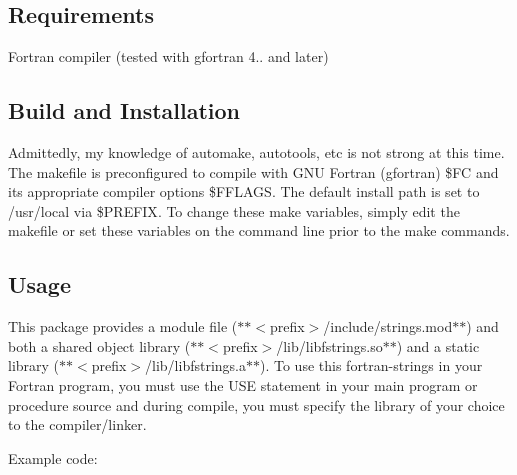\subsection*{Requirements}


\begin{DoxyItemize}
\item Fortran compiler (tested with gfortran 4.. and later)
\end{DoxyItemize}

\subsection*{Build and Installation}

Admittedly, my knowledge of automake, autotools, etc is not strong at this time. The makefile is preconfigured to compile with G\+NU Fortran (gfortran) {\ttfamily \$\+FC} and its appropriate compiler options {\ttfamily \$\+F\+F\+L\+A\+GS}. The default install path is set to {\ttfamily /usr/local} via {\ttfamily \$\+P\+R\+E\+F\+IX}. To change these make variables, simply edit the makefile or set these variables on the command line prior to the make commands.


\begin{DoxyCode}{0}
\end{DoxyCode}


\subsection*{Usage}

This package provides a module file ($\ast$$\ast${\ttfamily $<$prefix$>$/include/strings.mod}$\ast$$\ast$) and both a shared object library ($\ast$$\ast${\ttfamily $<$prefix$>$/lib/libfstrings.so}$\ast$$\ast$) and a static library ($\ast$$\ast${\ttfamily $<$prefix$>$/lib/libfstrings.a}$\ast$$\ast$). To use this {\ttfamily fortran-\/strings} in your Fortran program, you must use the {\ttfamily U\+SE} statement in your main program or procedure source and during compile, you must specify the library of your choice to the compiler/linker.

Example code\+:


